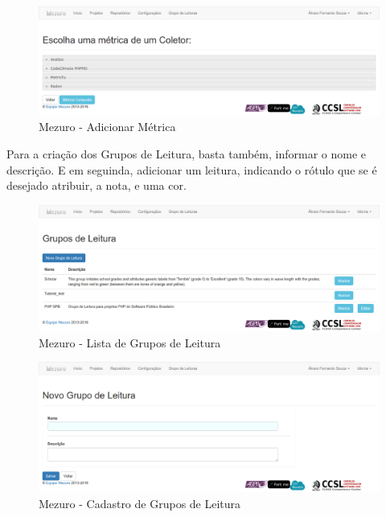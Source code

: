 \begin{figure}[!htb]
	\centering
    \includegraphics[keepaspectratio=true,scale=0.3]
    {figuras/mezuro-configuracao-add-metric.eps}
  \caption{Mezuro - Adicionar Métrica}
	\label{fig:mezuro-configuracao-add-metric}
\end{figure}

\newpage

Para a criação dos Grupos de Leitura, basta também, informar o nome e descrição.
E em seguinda, adicionar um leitura, indicando o rótulo que se é desejado atribuir,
a nota, e uma cor.

\begin{figure}[!htb]
	\centering
    \includegraphics[keepaspectratio=true,scale=0.3]
    {figuras/mezuro-leituras.eps}
  \caption{Mezuro - Lista de Grupos de Leitura}
	\label{fig:mezuro-leituras}
\end{figure}

\begin{figure}[!htb]
	\centering
    \includegraphics[keepaspectratio=true,scale=0.3]
    {figuras/mezuro-leitura-cadastro.eps}
  \caption{Mezuro - Cadastro de Grupos de Leitura}
	\label{fig:mezuro-leitura-cadastro}
\end{figure}

